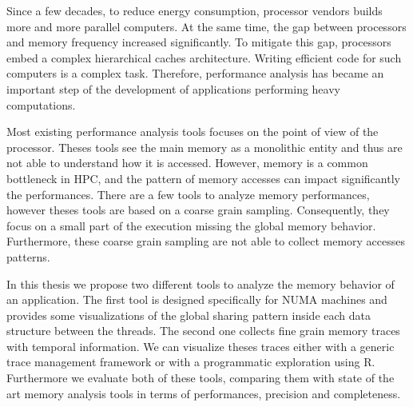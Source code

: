 
Since a few decades, to reduce energy consumption, processor vendors builds more and more parallel computers.
At the same time, the gap between processors and memory frequency increased significantly.
To mitigate this gap, processors embed a complex hierarchical caches architecture.
Writing efficient code for such computers is a complex task.
Therefore, performance analysis has became an important step of the development of applications performing heavy computations.

Most existing performance analysis tools focuses on the point of view of the processor.
Theses tools see the main memory as a monolithic entity and thus are not able to understand how it is accessed.
However, memory is a common bottleneck in \gls{HPC}, and the pattern of memory accesses can impact significantly the performances.
There are a few tools to analyze memory performances, however theses tools are based on a coarse grain sampling.
Consequently, they focus on a small part of the execution missing the global memory behavior.
Furthermore, these coarse grain sampling are not able to collect memory accesses patterns.

In this thesis we propose two different tools to analyze the memory behavior of an application.
The first tool is designed specifically for \gls{NUMA} machines and provides some visualizations of the global sharing pattern inside each data structure between the threads.
The second one collects fine grain memory traces with temporal information.
We can visualize theses traces either with a generic trace management framework or with a programmatic exploration using R.
Furthermore we evaluate both of these tools, comparing them with state of the art memory analysis tools in terms of performances, precision and completeness.

\glsresetall
